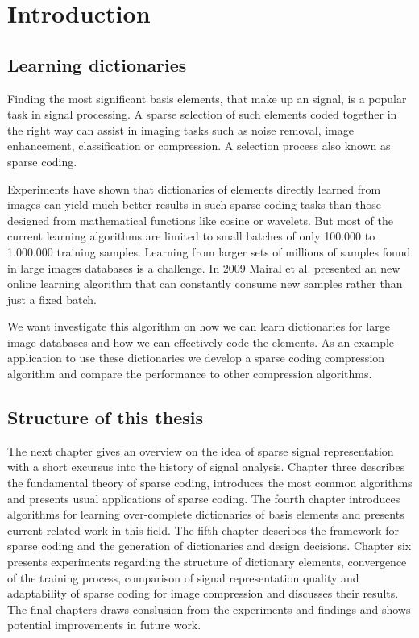 \chapter{Introduction}
\label{sec:introduction}
\section{Learning dictionaries}

Finding the most significant basis elements, that make up an
signal, is a popular task in signal processing. A sparse selection of such
elements coded together in the right way can assist in imaging tasks such as
noise removal, image enhancement, classification or compression. A selection
process also known as sparse coding.

Experiments \cite{Chen1998,Elad2006} have shown that dictionaries of 
elements directly learned from images can yield much better results in
such sparse coding tasks than those designed from mathematical functions like
cosine or wavelets. But most of the current learning algorithms are limited to
small batches of only 100.000 to 1.000.000 training samples. Learning from
larger sets of millions of samples found in large images databases is a
challenge. In 2009 Mairal et al.\cite{Mairal2009} presented an new online
learning algorithm that can constantly consume new samples rather than just a
fixed batch. 

We want investigate this algorithm on how we can learn dictionaries
for large image databases and how we can effectively code the elements.
As an example application to use these dictionaries we develop a sparse coding
compression algorithm and compare the performance to other
compression algorithms.

\section{Structure of this thesis}
The next chapter gives an overview on the idea of sparse signal
representation with a short excursus into the history of signal analysis.
Chapter three describes the fundamental theory of sparse coding, introduces the
most common algorithms and presents usual applications of sparse coding. The
fourth chapter introduces algorithms for learning over-complete
dictionaries of basis elements and presents current related work in this field.
The fifth chapter describes the framework for sparse coding and the generation
of dictionaries and design decisions. Chapter six presents experiments regarding
the structure of dictionary elements, convergence of the training process,
comparison of signal representation quality and adaptability of sparse coding
for image compression and discusses their results. The final chapters draws
conslusion from the experiments and findings and shows potential improvements in
future work. 


